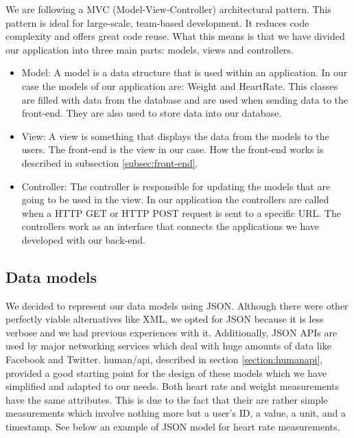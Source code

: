 We are following a MVC (Model-View-Controller) architectural pattern. 
This pattern is ideal for large-scale, team-based development.
It reduces code complexity and offers great code reuse. 
What this means is that we have divided our application into three main parts: models, views and controllers.

\begin{itemize}

\item Model: A model is a data structure that is used within an application.
In our case the models of our application are: Weight and HeartRate.
This classes are filled with data from the database and are used when sending data to the front-end.
They are also used to store data into our database.

\item View: A view is something that displays the data from the models to the users.
The front-end is the view in our case.
How the front-end works is described in subsection \ref{subsec:front-end}.

\item Controller: The controller is responsible for updating the models that are going to be used in the view.
In our application the controllers are called when a HTTP GET or HTTP POST request is sent to a specific URL.
The controllers work as an interface that connects the applications we have developed with our back-end.

\end{itemize}

\subsection{Data models}
\label{subsec:models}

We decided to represent our data models using JSON.
Although there were other perfectly viable alternatives like XML,
we opted for JSON because it is less verbose and we had previous experiences with it.
Additionally, JSON APIs are used by major networking services which deal with huge amounts of
data like Facebook and Twitter.
human/api, described in section \ref{section:humanapi}, provided a good starting point for the design of
these models which we have simplified and adapted to our needs.
Both heart rate and weight measurements have the same attributes.
This is due to the fact that their are rather simple measurements which involve nothing more but
a user's ID, a value, a unit, and a timestamp.
See below an example of JSON model for heart rate measurements.

